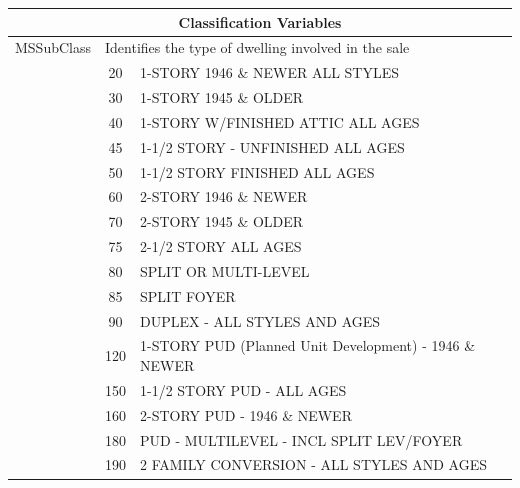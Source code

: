 \documentclass[11pt]{scrartcl} %
\begin{document}
\begin{center}
\begin{tabular}{c c c c c c}
\hline
\multicolumn{6}{|c|}{Classification Variables}\\
\hline
\multicolumn{2}{|c}{MSSubClass} & \multicolumn{4}{l|}{Identifies the type of dwelling involved in the sale}\\ 
\multicolumn{2}{|c}{} & \multicolumn{1}{c}{20} & \multicolumn{3}{l|}{1-STORY 1946 \& NEWER ALL STYLES}\\
\multicolumn{2}{|c}{} & \multicolumn{1}{c}{30} & \multicolumn{3}{l|}{1-STORY 1945 \& OLDER}\\
\multicolumn{2}{|c}{} & \multicolumn{1}{c}{40} & \multicolumn{3}{l|}{1-STORY W/FINISHED ATTIC ALL AGES}\\
\multicolumn{2}{|c}{} & \multicolumn{1}{c}{45} & \multicolumn{3}{l|}{1-1/2 STORY - UNFINISHED ALL AGES}\\
\multicolumn{2}{|c}{} & \multicolumn{1}{c}{50} & \multicolumn{3}{l|}{1-1/2 STORY FINISHED ALL AGES}\\
\multicolumn{2}{|c}{} & \multicolumn{1}{c}{60} & \multicolumn{3}{l|}{2-STORY 1946 \& NEWER}\\
\multicolumn{2}{|c}{} & \multicolumn{1}{c}{70} & \multicolumn{3}{l|}{2-STORY 1945 \& OLDER}\\
\multicolumn{2}{|c}{} & \multicolumn{1}{c}{75} & \multicolumn{3}{l|}{2-1/2 STORY ALL AGES}\\
\multicolumn{2}{|c}{} & \multicolumn{1}{c}{80} & \multicolumn{3}{l|}{SPLIT OR MULTI-LEVEL}\\
\multicolumn{2}{|c}{} & \multicolumn{1}{c}{85} & \multicolumn{3}{l|}{SPLIT FOYER}\\
\multicolumn{2}{|c}{} & \multicolumn{1}{c}{90} & \multicolumn{3}{l|}{DUPLEX - ALL STYLES AND AGES}\\
\multicolumn{2}{|c}{} & \multicolumn{1}{c}{120} & \multicolumn{3}{l|}{1-STORY PUD (Planned Unit Development) - 1946 \& NEWER}\\
\multicolumn{2}{|c}{} & \multicolumn{1}{c}{150} & \multicolumn{3}{l|}{1-1/2 STORY PUD - ALL AGES}\\
\multicolumn{2}{|c}{} & \multicolumn{1}{c}{160} & \multicolumn{3}{l|}{2-STORY PUD - 1946 \& NEWER}\\
\multicolumn{2}{|c}{} & \multicolumn{1}{c}{180} & \multicolumn{3}{l|}{PUD - MULTILEVEL - INCL SPLIT LEV/FOYER}\\
\multicolumn{2}{|c}{} & \multicolumn{1}{c}{190} & \multicolumn{3}{l|}{2 FAMILY CONVERSION - ALL STYLES AND AGES}\\

\end{tabular}
\end{center}
\end{document}
